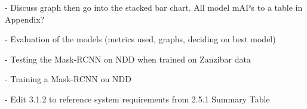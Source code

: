- Discuss graph then go into the stacked bar chart. All model mAPs to a table in Appendix?

- Evaluation of the models (metrics used, graphs, deciding on best model)

- Testing the Mask-RCNN on NDD when trained on Zanzibar data

- Training a Mask-RCNN on NDD

- Edit 3.1.2 to reference system requirements from 2.5.1 Summary Table 

